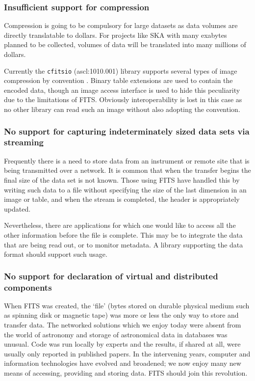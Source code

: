 \documentclass[final,authoryear,5p,times,twocolumn]{elsarticle}
\begin{document}
\subsubsection{Insufficient support for compression}

Compression is going to be compulsory for large datasets as data volumes
are directly translatable to dollars. For projects like SKA with many
exabytes planned to be collected, volumes of data will be translated into
many millions of dollars.

Currently the \texttt{cfitsio} (ascl:1010.001) library supports
several types of image compression by convention
\citep[see e.g.][ascl:1010.002]{2000ASPC..216..551P,2007ASPC..376..483S,2009PASP..121..414P}.  Binary table
extensions are used to contain the encoded data, though an image
access interface is used to hide this peculiarity due to the
limitations of FITS. Obviously interoperability is lost in this case
as no other library can read such an image without also adopting the
convention.

\subsubsection{No support for capturing indeterminately sized data sets via streaming}


Frequently there is a need to store data from an instrument or remote
site that is being transmitted over a network. It is common that when
the transfer begins the final size of the data set is not known. Those
using FITS have handled this by writing such data to a file without
specifying the size of the last dimension in an image or table, and
when the stream is completed, the header is appropriately updated.


Nevertheless, there are applications for which one would like to
access all the other information before the file is complete. This may
be to integrate the data that are being read out, or to monitor
metadata. A library supporting the data format should support such
usage.


\subsubsection{No support for declaration of virtual and distributed components}


When FITS was created, the `file' (bytes stored on durable physical
medium such as spinning disk or magnetic tape) was more or less the
only way to store and transfer data. The networked solutions which we
enjoy today were absent from the world of astronomy and storage of
astronomical data in databases was unusual. Code was run locally by
experts and the results, if shared at all, were usually only reported
in published papers. In the intervening years, computer and
information technologies have evolved and broadened; we now enjoy many
new means of accessing, providing and storing data. FITS should join
this revolution.
\end{document}
